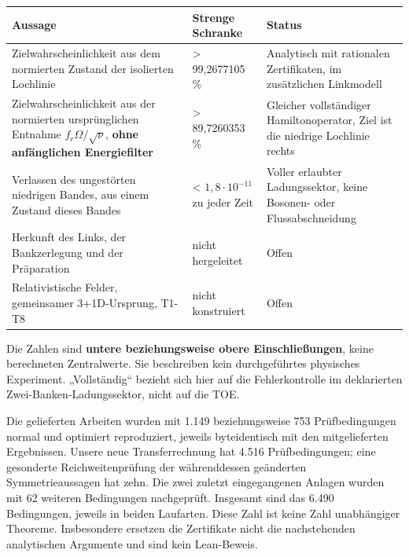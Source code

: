 {\def\LTcaptype{none} %
\begin{longtable}[]{@{}
  >{\raggedright\arraybackslash}p{}
  >{\raggedleft\arraybackslash}p{}
  >{\raggedright\arraybackslash}p{}@{}}
\toprule\noalign{}
\begin{minipage}[b]{\linewidth}\raggedright
Aussage
\end{minipage} & \begin{minipage}[b]{\linewidth}\raggedleft
Strenge Schranke
\end{minipage} & \begin{minipage}[b]{\linewidth}\raggedright
Status
\end{minipage} \\
\midrule\noalign{}
\endhead
\bottomrule\noalign{}
\endlastfoot
Zielwahrscheinlichkeit aus dem normierten Zustand der isolierten
Lochlinie & \textgreater{} 99,2677105 \% & Analytisch mit rationalen
Zertifikaten, im zusätzlichen Linkmodell \\
Zielwahrscheinlichkeit aus der normierten ursprünglichen Entnahme
\(f_r\Omega/\sqrt\nu\), \textbf{ohne anfänglichen Energiefilter} &
\textgreater{} 89,7260353 \% & Gleicher vollständiger Hamiltonoperator,
Ziel ist die niedrige Lochlinie rechts \\
Verlassen des ungestörten niedrigen Bandes, aus einem Zustand dieses
Bandes & \textless{} \(1{,}8\cdot10^{-11}\) zu jeder Zeit & Voller
erlaubter Ladungssektor, keine Bosonen- oder Flussabschneidung \\
Herkunft des Links, der Bankzerlegung und der Präparation & nicht
hergeleitet & Offen \\
Relativistische Felder, gemeinsamer 3+1D-Ursprung, T1-T8 & nicht
konstruiert & Offen \\
\end{longtable}
}

Die Zahlen sind \textbf{untere beziehungsweise obere Einschließungen},
keine berechneten Zentralwerte. Sie beschreiben kein durchgeführtes
physisches Experiment. „Vollständig`` bezieht sich hier auf die
Fehlerkontrolle im deklarierten Zwei-Banken-Ladungssektor, nicht auf die
TOE.

Die gelieferten Arbeiten wurden mit 1.149 beziehungsweise 753
Prüfbedingungen normal und optimiert reproduziert, jeweils byteidentisch
mit den mitgelieferten Ergebnissen. Unsere neue Transferrechnung hat
4.516 Prüfbedingungen; eine gesonderte Reichweitenprüfung der
währenddessen geänderten Symmetrieaussagen hat zehn. Die zwei zuletzt
eingegangenen Anlagen wurden mit 62 weiteren Bedingungen nachgeprüft.
Insgesamt sind das 6.490 Bedingungen, jeweils in beiden Laufarten. Diese
Zahl ist keine Zahl unabhängiger Theoreme. Insbesondere ersetzen die
Zertifikate nicht die nachstehenden analytischen Argumente und sind kein
Lean-Beweis.

